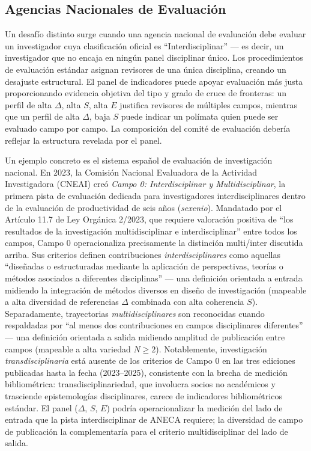 \documentclass[
]{article}
\begin{document}
\hypertarget{agencias-nacionales-de-evaluaciuxf3n}{%
\subsection{Agencias Nacionales de
Evaluación}\label{agencias-nacionales-de-evaluaciuxf3n}}

Un desafío distinto surge cuando una agencia nacional de evaluación debe
evaluar un investigador cuya clasificación oficial es
``Interdisciplinar'' --- es decir, un investigador que no encaja en
ningún panel disciplinar único. Los procedimientos de evaluación
estándar asignan revisores de una única disciplina, creando un desajuste
estructural. El panel de indicadores puede apoyar evaluación más justa
proporcionando evidencia objetiva del tipo y grado de cruce de
fronteras: un perfil de alta \(\Delta\), alta \(S\), alta \(E\)
justifica revisores de múltiples campos, mientras que un perfil de alta
\(\Delta\), baja \(S\) puede indicar un polímata quien puede ser
evaluado campo por campo. La composición del comité de evaluación
debería reflejar la estructura revelada por el panel.

Un ejemplo concreto es el sistema español de evaluación de investigación
nacional. En 2023, la Comisión Nacional Evaluadora de la Actividad
Investigadora (CNEAI) creó \emph{Campo 0: Interdisciplinar y
Multidisciplinar}, la primera pista de evaluación dedicada para
investigadores interdisciplinares dentro de la evaluación de
productividad de seis años (\emph{sexenio}). Mandatado por el Artículo
11.7 de Ley Orgánica 2/2023, que requiere valoración positiva de ``los
resultados de la investigación multidisciplinar e interdisciplinar''
entre todos los campos, Campo 0 operacionaliza precisamente la
distinción multi/inter discutida arriba. Sus criterios definen
contribuciones \emph{interdisciplinares} como aquellas ``diseñadas o
estructuradas mediante la aplicación de perspectivas, teorías o métodos
asociados a diferentes disciplinas'' --- una definición orientada a
entrada midiendo la integración de métodos diversos en diseño de
investigación (mapeable a alta diversidad de referencias \(\Delta\)
combinada con alta coherencia \(S\)). Separadamente, trayectorias
\emph{multidisciplinares} son reconocidas cuando respaldadas por ``al
menos dos contribuciones en campos disciplinares diferentes'' --- una
definición orientada a salida midiendo amplitud de publicación entre
campos (mapeable a alta variedad \(N \geq 2\)). Notablemente,
investigación \emph{transdisciplinaria} está ausente de los criterios de
Campo 0 en las tres ediciones publicadas hasta la fecha (2023--2025),
consistente con la brecha de medición bibliométrica:
transdisciplinariedad, que involucra socios no académicos y trasciende
epistemologías disciplinares, carece de indicadores bibliométricos
estándar. El panel (\(\Delta\), \(S\), \(E\)) podría operacionalizar la
medición del lado de entrada que la pista interdisciplinar de ANECA
requiere; la diversidad de campo de publicación la complementaría para
el criterio multidisciplinar del lado de salida.
\end{document}
